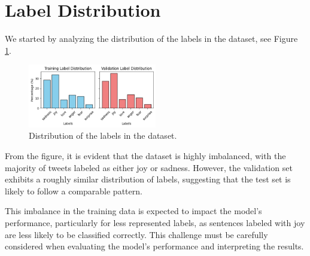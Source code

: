 \section{Label Distribution}\label{sec:label_distribution}
We started by analyzing the distribution of the labels in the dataset, see Figure \ref{fig:label_dist}.
\begin{figure}[H]
    \vspace*{0.7cm}
    \centering
    \includegraphics[width=0.5\textwidth]{figures/label_dist.png}
    \caption{Distribution of the labels in the dataset.}
    \label{fig:label_dist}
    \vspace*{0.7cm}
\end{figure}
From the figure, it is evident that the dataset is highly imbalanced, with the majority of tweets labeled as either joy or sadness. However, the validation set exhibits a roughly similar distribution of labels, suggesting that the test set is likely to follow a comparable pattern.

This imbalance in the training data is expected to impact the model's performance, particularly for less represented labels, as sentences labeled with joy are less likely to be classified correctly. This challenge must be carefully considered when evaluating the model's performance and interpreting the results.